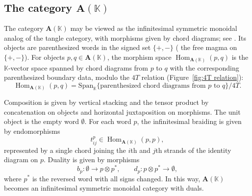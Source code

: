 \documentclass{amsart}
\newcommand{\bA}{\mathbf{A}}
\newcommand{\bS}{\mathbf{S}}
\newcommand{\kk}{\mathbb{K}}    %
\newcommand{\id}{\operatorname{id}}
\newcommand{\Hom}{\operatorname{Hom}}
\newtheorem{prop}[theorem]{Proposition}%
\theoremstyle{definition}
\newtheorem{remark}[theorem]{Remark}%
\numberwithin{equation}{section}
\begin{document}

\subsection{The category $\bA(\kk)$}
The category $\bA(\kk)$ may be viewed as the infinitesimal symmetric monoidal analog of the tangle category, with morphisms given by chord diagrams; see \cite[Section 5.3]{KT_Tangles}. Its objects are parenthesized words in the signed set $\{+,-\}$ ( the free magma on $\{+,-\}$). For objects $p,q\in \bA(\kk)$, the morphism space $\Hom_{\bA(\kk)}(p,q)$ is the $\kk$-vector space spanned by chord diagrams from $p$ to $q$ with the corresponding parenthesized boundary data, modulo the $4T$ relation (Figure~\ref{fig:4T relation}):
\[
\Hom_{\bA(\kk)}(p,q)
=
\mathrm{Span}_{\kk}\{\text{parenthesized chord diagrams from $p$ to $q$}\}/4T.
\]

Composition is given by vertical stacking and the tensor product by concatenation on objects and horizontal juxtaposition on morphisms. The unit object is the empty word $\emptyset$. For each word $p$, the infinitesimal braiding is given by endomorphisms
\[
t^p_{ij}\in \Hom_{\bA(\kk)}(p,p),
\]
represented by a single chord joining the $i$th and $j$th strands of the identity diagram on $p$. Duality is given by morphisms
\[
b_p:\emptyset\to p\otimes p^*,
\qquad
d_p:p\otimes p^*\to \emptyset,
\]
where $p^*$ is the reversed word with all signs changed. In this way, $\bA(\kk)$ becomes an infinitesimal symmetric monoidal category with duals.
\end{document}
